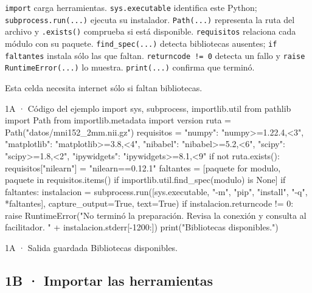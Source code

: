 \texttt{\small import} carga herramientas. \texttt{\small sys.\allowbreak{}executable} identifica este Python; \texttt{\small subprocess.\allowbreak{}run(\allowbreak{}.\allowbreak{}.\allowbreak{}.\allowbreak{})\allowbreak{}} ejecuta su instalador. \texttt{\small Path(\allowbreak{}.\allowbreak{}.\allowbreak{}.\allowbreak{})\allowbreak{}} representa la ruta del archivo y \texttt{\small .\allowbreak{}exists(\allowbreak{})\allowbreak{}} comprueba si está disponible. \texttt{\small requisitos} relaciona cada módulo con su paquete. \texttt{\small find\_spec(\allowbreak{}.\allowbreak{}.\allowbreak{}.\allowbreak{})\allowbreak{}} detecta bibliotecas ausentes; \texttt{\small if faltantes} instala sólo las que faltan. \texttt{\small returncode != 0} detecta un fallo y \texttt{\small raise RuntimeError(\allowbreak{}.\allowbreak{}.\allowbreak{}.\allowbreak{})\allowbreak{}} lo muestra. \texttt{\small print(\allowbreak{}.\allowbreak{}.\allowbreak{}.\allowbreak{})\allowbreak{}} confirma que terminó.

Esta celda necesita internet sólo si faltan bibliotecas.

\begin{CodigoVivo}{1A · Código del ejemplo}
import sys, subprocess, importlib.util
from pathlib import Path
from importlib.metadata import version
ruta = Path("datos/mni152_2mm.nii.gz")
requisitos = {"numpy": "numpy>=1.22.4,<3", "matplotlib": "matplotlib>=3.8,<4", "nibabel": "nibabel>=5.2,<6", "scipy": "scipy>=1.8,<2", "ipywidgets": "ipywidgets>=8.1,<9"}
if not ruta.exists():
    requisitos["nilearn"] = "nilearn==0.12.1"
faltantes = [paquete for modulo, paquete in requisitos.items() if importlib.util.find_spec(modulo) is None]
if faltantes:
    instalacion = subprocess.run([sys.executable, "-m", "pip", "install", "-q", *faltantes], capture_output=True, text=True)
    if instalacion.returncode != 0:
        raise RuntimeError("No terminó la preparación. Revisa la conexión y consulta al facilitador. " + instalacion.stderr[-1200:])
print("Bibliotecas disponibles.")
\end{CodigoVivo}


\begin{Salida}{1A · Salida guardada}
Bibliotecas disponibles.
\end{Salida}



\subsection*{1B · Importar las herramientas}

